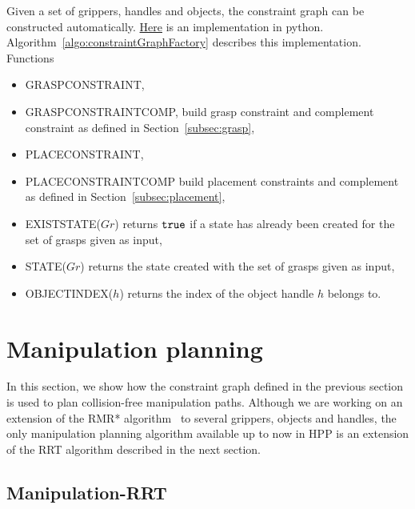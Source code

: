 Given a set of grippers, handles and objects, the constraint graph can be constructed automatically. \href{https://github.com/humanoid-path-planner/hpp-manipulation-corba/blob/5af1b3bad68e8c339d5f42eb72173d7356504532/src/hpp/corbaserver/manipulation/constraint_graph_factory.py\#L187}{Here} is an implementation in python. Algorithm~\ref{algo:constraintGraphFactory} describes this implementation.
Functions
\begin{itemize}
\item {\scriptsize GRASP}{\small C}{\scriptsize ONSTRAINT},
\item {\scriptsize GRASP}{\small C}{\scriptsize ONSTRAINT}{\small C}{\scriptsize OMP}, build grasp constraint and complement constraint as defined in Section~\ref{subsec:grasp},
\item {\scriptsize PLACE}{\small C}{\scriptsize ONSTRAINT},
\item {\scriptsize PLACE}{\small C}{\scriptsize ONSTRAINT}{\small C}{\scriptsize OMP} build placement constraints and complement as defined in Section~\ref{subsec:placement},
\item {\scriptsize EXIST}{\small S}{\scriptsize TATE}($Gr$) returns $\texttt{true}$ if a state has already been created for the set of grasps given as input,
\item{\scriptsize STATE}($Gr$) returns the state created with the set of grasps given as input,
\item {\scriptsize OBJECT}{\small I}{\scriptsize NDEX}($h$) returns the index of the object handle $h$ belongs to.
\end{itemize}

\section{Manipulation planning}\label{sec:manipulation-planning}

In this section, we show how the constraint graph defined in the previous section is used to plan collision-free manipulation paths. Although we are working on an extension of the RMR* algorithm~\cite{schmitt17icra} to several grippers, objects and handles, the only manipulation planning algorithm available up to now in HPP is an extension of the RRT algorithm described in the next section.

\subsection{Manipulation-RRT}

